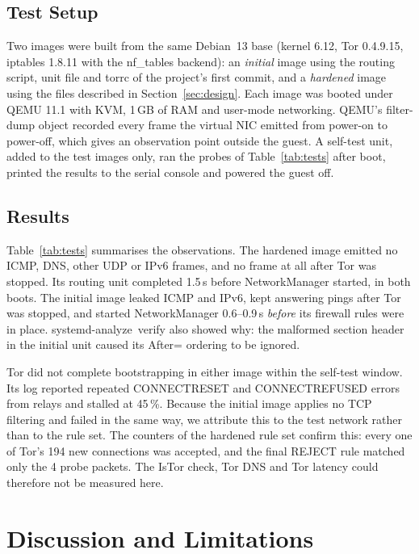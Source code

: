 \documentclass[10pt,twocolumn,a4paper]{article}
\DeclareRobustCommand{\texttt}[1]{\mbox{\ttfamily #1}}
\begin{document}
\subsection{Test Setup}
Two images were built from the same Debian~13 base (kernel 6.12,
Tor 0.4.9.15, \texttt{iptables} 1.8.11 with the \texttt{nf\_tables}
backend): an \emph{initial} image using the routing script, unit file
and \texttt{torrc} of the project's first commit, and a \emph{hardened}
image using the files described in Section~\ref{sec:design}. Each image
was booted under QEMU 11.1 with KVM, 1\,GB of RAM and user-mode
networking. QEMU's \texttt{filter-dump} object recorded every frame the
virtual NIC emitted from power-on to power-off, which gives an
observation point outside the guest. A self-test unit, added to the test
images only, ran the probes of Table~\ref{tab:tests} after boot,
printed the results to the serial console and powered the guest off.

\subsection{Results}
Table~\ref{tab:tests} summarises the observations. The hardened image
emitted no ICMP, DNS, other UDP or IPv6 frames, and no frame at all
after Tor was stopped. Its routing unit completed 1.5\,s before
NetworkManager started, in both boots. The initial image leaked ICMP
and IPv6, kept answering pings after Tor was stopped, and started
NetworkManager 0.6--0.9\,s \emph{before} its firewall rules were in
place. \texttt{systemd-analyze verify} also showed why: the malformed
section header in the initial unit caused its \texttt{After=} ordering
to be ignored.

Tor did not complete bootstrapping in either image within the
self-test window. Its log reported repeated
\texttt{CONNECTRESET} and \texttt{CONNECTREFUSED} errors from relays and
stalled at 45\,\%. Because the initial image applies no TCP filtering
and failed in the same way, we attribute this to the test network
rather than to the rule set. The counters of the hardened rule set
confirm this: every one of Tor's 194 new connections was accepted, and
the final \texttt{REJECT} rule matched only the 4 probe packets.
The \texttt{IsTor} check, Tor DNS and Tor latency could therefore not
be measured here.

\section{Discussion and Limitations}
\label{sec:limits}
\end{document}
